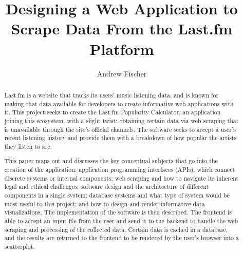 \documentclass[12pt,code,palatino,picins,blacklinks,kaukecopyright,openright,oneside,final]{woosterthesis} %
\title{Designing a Web Application to Scrape Data From the Last.fm Platform}
\author{Andrew Fischer}
\begin{document}
%
%

\frontmatter
{}

%                                                                                       
%                                                                                       

\begin{abstract}

Last.fm is a website that tracks its users' music listening data, and is known for making that data available for developers to create informative web applications with it. This project seeks to create the Last.fm Popularity Calculator, an application joining this ecosystem, with a slight twist: obtaining certain data via web scraping that is unavailable through the site's official channels. The software seeks to accept a user's recent listening history and provide them with a breakdown of how popular the artists they listen to are.

This paper maps out and discusses the key conceptual subjects that go into the creation of the application: application programming interfaces (APIs), which connect discrete systems or internal components; web scraping and how to navigate its inherent legal and ethical challenges; software design and the architecture of different components in a single system; database systems and what type of system would be most useful to this project; and how to design and render informative data visualizations. The implementation of the software is then described. The frontend is able to accept an input file from the user and send it to the backend to handle the web scraping and processing of the collected data. Certain data is cached in a database, and the results are returned to the frontend to be rendered by the user's browser into a scatterplot. 

\end{abstract}
\end{document}
